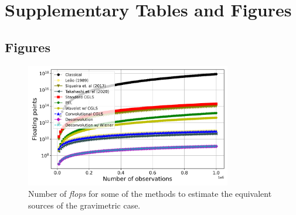 





%




\section{Supplementary Tables and Figures}

\subsection{Figures}

\begin{figure}[htbp]
\begin{center}
\includegraphics[width=9cm]{Fig/flops_grav}%
\end{center}
\caption{Number of \textit{flops} for some of the methods to estimate the equivalent sources of the gravimetric case.}
\label{fig:1}
\end{figure}

